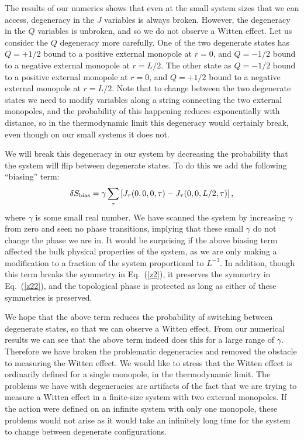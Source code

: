The results of our numerics shows that even at the small system sizes that we can access, degeneracy in the $J$ variables is always broken. However, the degeneracy in the $Q$ variables is unbroken, and so we do not observe a Witten effect. Let us consider the $Q$ degeneracy more carefully. One of the two degenerate states has $Q=+1/2$ bound to a positive external monopole at $r=0$, and $Q=-1/2$ bound to a negative external monopole at $r=L/2$. The other state as $Q=-1/2$ bound to a positive external monopole at $r=0$, and $Q=+1/2$ bound to a negative external monopole at $r=L/2$. Note that to change between the two degenerate states we need to modify variables along a string connecting the two external monopoles, and the probability of this happening reduces exponentially with distance, so in the thermodynamic limit this degeneracy would certainly break, even though on our small systems it does not. 

We will break this degeneracy in our system by decreasing the probability that the system will flip between degenerate states. To do this we add the following ``biasing'' term:
\begin{equation}
\delta S_{\rm bias}=\gamma  \sum_{\tau}\left[J_\tau(0,0,0,\tau)-J_\tau(0,0,L/2,\tau)\right],
\label{bias}
\end{equation}
where $\gamma$ is some small real number. We have scanned the system by increasing $\gamma$ from zero and seen no phase transitions, implying that these small $\gamma$ do not change the phase we are in. It would be surprising if the above biasing term affected the bulk physical properties of the system, as we are only making a modification to a fraction of the system proportional to $L^{-3}$. In addition, though this term breaks the symmetry in Eq.~(\ref{z2}), it preserves the symmetry in Eq.~(\ref{z22}), and the topological phase is protected as long as either of these symmetries is preserved. 

We hope that the above term reduces the probability of switching between degenerate states, so that we can observe a Witten effect. From our numerical results we can see that the above term indeed does this for a large range of $\gamma$. Therefore we have broken the problematic degeneracies and removed the obstacle to measuring the Witten effect. We would like to stress that the Witten effect is ordinarily defined for a single monopole, in the thermodynamic limit. The problems we have with degeneracies are artifacts of the fact that we are trying to measure a Witten effect in a finite-size system with two external monopoles. If the action were defined on an infinite system with only one monopole, these problems would not arise as it would take an infinitely long time for the system to change between degenerate configurations.

